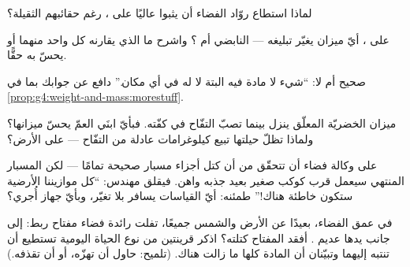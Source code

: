 \begin{exercise}[$\star$]\label{exo:g4:weight-and-mass:6}
لماذا استطاع روّاد الفضاء أن يثبوا عاليًا على ، رغم حقائبهم
الثقيلة؟
\end{exercise}

\begin{exercise}[$\star$]\label{exo:g4:weight-and-mass:7}
على ، أيّ ميزان يغيّر تبليغه --- النابضي أم ؟ واشرح ما الذي يقارنه كل واحد منهما أو يحسّ به حقًّا.
\end{exercise}

\begin{exercise}[$\star$]\label{exo:g4:weight-and-mass:8}
صحيح أم لا: ``شيء لا مادة فيه البتة لا  له في أي مكان.''
دافع عن جوابك بما في
\cref{prop:g4:weight-and-mass:morestuff}.
\end{exercise}

\begin{exercise}[$\star$]\label{exo:g4:weight-and-mass:9}
ميزان الخضريّة المعلّق ينزل بينما تصبّ التفّاح في كفّته. فبأيّ
ابنَي العمّ يحسّ ميزانها؟ ولماذا تظلّ حيلتها تبيع كيلوغرامات
عادلة من التفّاح --- على الأرض؟
\end{exercise}

\begin{exercise}[$\star\star$]\label{exo:g4:weight-and-mass:10}
على وكالة فضاء أن تتحقّق من أن كتل أجزاء مسبار صحيحة تمامًا ---
لكن المسبار المنتهي سيعمل قرب كوكب صغير بعيد جذبه واهن. فيقلق
مهندس: ``كل موازيننا الأرضية ستكون خاطئة هناك!'' طمئنه: أيّ
القياسات يسافر بلا تغيّر، وبأيّ جهاز أُجري؟
\end{exercise}

\begin{exercise}[$\star\star$]\label{exo:g4:weight-and-mass:11}
في عمق الفضاء، بعيدًا عن الأرض  والشمس جميعًا، تفلت رائدة
فضاء مفتاح ربط:  إلى جانب يدها عديم . أفقد المفتاح
كتلته؟ اذكر قرينتين من نوع الحياة اليومية تستطيع أن تنتبه
إليهما وتبيّنان أن المادة كلها ما زالت هناك. (تلميح: حاول أن
تهزّه، أو أن تقذفه.)
\end{exercise}
